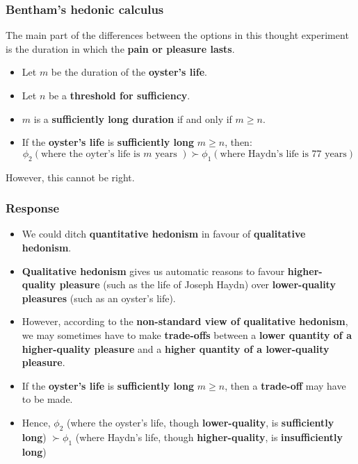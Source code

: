 \documentclass[11pt]{article}
\begin{document}
\subsubsection{Bentham's hedonic calculus}
\label{sec:org26e4ac6}
The main part of the differences between the options in this thought experiment is the duration in which the \textbf{pain or pleasure lasts}.  \\

\begin{itemize}
\item Let \(m\) be the duration of the \textbf{oyster's life}.
\item Let \(n\) be a \textbf{threshold for sufficiency}.
\item \(m\) is a \textbf{sufficiently long duration} if and only if \(m \ge n\).
\item If the \textbf{oyster's life} is \textbf{sufficiently long} \(m \ge n\), then:
\[\phi_2 (\text{where the oyter's life is } m \text{ years }) \succ \phi_1 (\text{where Haydn's life is 77 years})\]
\end{itemize}

However, this cannot be right.

 \newpage
\subsubsection{Response}
\label{sec:orgbb66668}
\begin{itemize}
\item We could ditch \textbf{quantitative hedonism} in favour of \textbf{qualitative hedonism}.
\item \textbf{Qualitative hedonism} gives us automatic reasons to favour \textbf{higher-quality pleasure} (such as the life of Joseph Haydn) over \textbf{lower-quality pleasures} (such as an oyster's life).
\item However, according to the \textbf{non-standard view of qualitative hedonism}, we may sometimes have to make \textbf{trade-offs} between a \textbf{lower quantity of a higher-quality pleasure} and a \textbf{higher quantity of a lower-quality pleasure}.
\item If the \textbf{oyster's life} is \textbf{sufficiently long} \(m \ge n\), then a \textbf{trade-off} may have to be made.
\item Hence, \(\phi_2\) (where the oyster's life, though \textbf{lower-quality}, is \textbf{sufficiently long}) \(\succ \phi_1\) (where Haydn's life, though \textbf{higher-quality}, is \textbf{insufficiently long})
\end{itemize}
\end{document}
